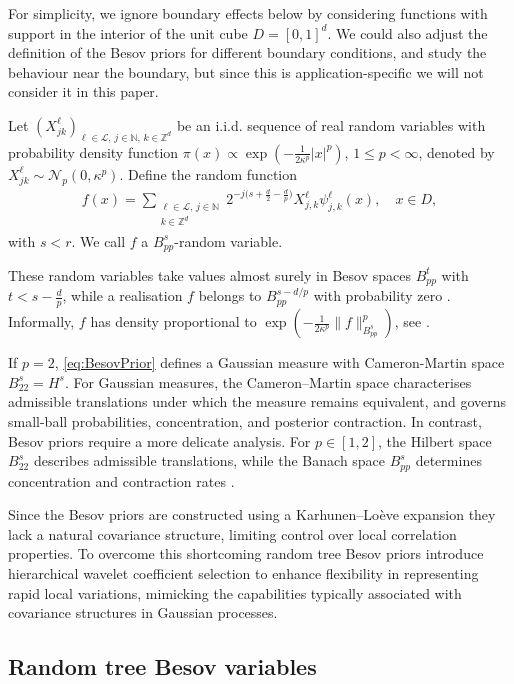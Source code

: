 \documentclass[11pt,a4paper]{article}
\newcommand{\kauno}{{\mathcal L}}
\newcommand{\Nn}{{\mathcal N}}
\newcommand{\N}{\mathbb{N}}
\newcommand{\Z}{\mathbb{Z}}
\begin{document}
For simplicity, we ignore boundary effects below by considering functions with support in the interior of the unit cube $D=[0,1]^d$. 
We could also adjust the definition of the Besov priors for different boundary conditions, and study the behaviour  near the boundary, but since this is application-specific we will not consider it in this paper.

Let $(X^\ell_{jk})_{\ell\in\kauno,\, j\in\N,\,k\in\Z^d}$ be an i.i.d. sequence of real random variables with probability density function $\pi(x)\propto\exp (-\frac{1}{2\kappa^p}|x|^{p})$, $1\leq p<\infty$, denoted by $X^\ell_{jk}\sim \Nn_p(0,\kappa^p)$.
Define the random function
\begin{align}\label{eq:BesovPrior}
f(x)=\sum_{\substack{\ell\in\kauno,\, j\in\N\\ k\in\Z^d}}
2^{-j\big(s+\frac d2-\frac dp\big)} X^\ell_{ j,k}\psi^\ell_{j,k}(x),\quad x\in D,
\end{align}
with $s<r$.  We call $f$ a $B^{s}_{pp}$-random variable.

These random variables take values almost surely in Besov spaces $B^{t}_{pp}$ with $t<s-\frac{d}{p}$, while a realisation $f$ belongs to $B^{s-d/p}_{pp}$ with probability zero \cite{Dashti2012}. Informally, $f$ has density proportional to $\exp(-\frac{1}{2\kappa^p}\|f\|_{B^s_{pp}}^p)$, see \cite{Dashti2012,Lassas2009}. 

If $p=2$, \eqref{eq:BesovPrior} defines a Gaussian measure with Cameron-Martin space $B^s_{22}=H^s$. For Gaussian measures, the Cameron–Martin space characterises admissible translations under which the measure remains equivalent, and governs small-ball probabilities, concentration, and posterior contraction. In contrast, Besov priors require a more delicate analysis. For $p\in[1,2]$, the Hilbert space $B^s_{22}$ describes admissible translations, while the Banach space $B^s_{pp}$ determines concentration and contraction rates \cite{Agapiou2021}. 

Since the Besov priors are constructed using a Karhunen--Lo\`eve expansion they  lack a natural covariance structure, limiting control over local correlation properties. To overcome this shortcoming random tree Besov priors introduce hierarchical wavelet coefficient selection to enhance flexibility in representing rapid local variations, mimicking the capabilities typically associated with covariance structures in Gaussian processes.\\


\subsection{Random tree Besov variables}\label{Sec:RandomTreeBesovVariables}
\end{document}
